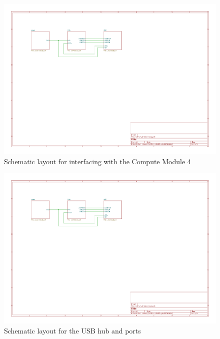 \begin{figure}[h]
  \centering
  \includegraphics[width=1\textwidth,page=3]{Figures/kicad/lathrum_thesis_schematic.pdf}
  \captionsetup{width=.8\linewidth}
  \caption[CM4 Schematic]{Schematic layout for interfacing with the Compute Module 4}
  \label{fig:pcb_schematic_cm4}
\end{figure}

\begin{figure}[h]
  \centering
  \includegraphics[width=1\textwidth,page=4]{Figures/kicad/lathrum_thesis_schematic.pdf}
  \captionsetup{width=.8\linewidth}
  \caption[USB Schematic]{Schematic layout for the USB hub and ports}
  \label{fig:pcb_schematic_usb}
\end{figure}

\clearpage
